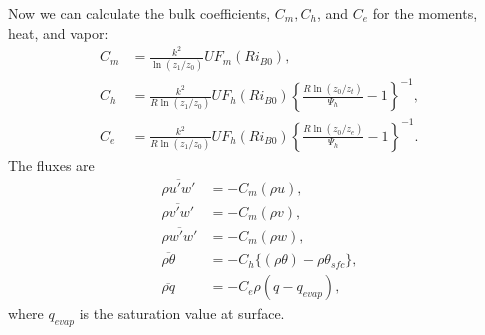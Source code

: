 Now we can calculate the bulk coefficients, $C_m, C_h$, and $C_e$ for the moments, heat, and vapor:
\begin{align}
  C_m &= \frac{k^2}{\ln(z_1/z_0)}UF_m(Ri_{B0}), \\
  C_h &= \frac{k^2}{R\ln(z_1/z_0)}UF_h(Ri_{B0})\left\{\frac{R\ln(z_0/z_t)}{\Psi_h}-1\right\}^{-1}, \\
  C_e &= \frac{k^2}{R\ln(z_1/z_0)}UF_h(Ri_{B0})\left\{\frac{R\ln(z_0/z_e)}{\Psi_h}-1\right\}^{-1}.
\end{align}
The fluxes are
\begin{align}
  \overline{\rho u'w'} &= - C_m (\rho u), \\
  \overline{\rho v'w'} &= - C_m (\rho v), \\
  \overline{\rho w'w'} &= - C_m (\rho w), \\
  \overline{\rho \theta} &= - C_h \{(\rho \theta) - \rho \theta_{sfc}\}, \\
  \overline{\rho q} &= -C_e \rho ( q - q_{evap} ),
\end{align}
where $q_{evap}$ is the saturation value at surface.

